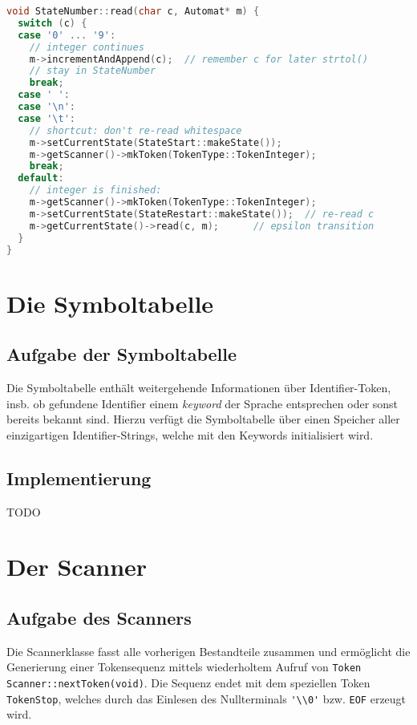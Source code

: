 \documentclass[
a4paper,   %
11pt,      %
oneside,   %
onecolumn, %
final      %
]{article}
\newcommand{\code}[1]{\lstinline$#1$}
\begin{document}
\begin{lstlisting}[language=C++, firstnumber=116, caption={Ausscchnitt aus \texttt{states.cpp}. Die \code{read()}-Methode des Zustands \texttt{Number}.}, label=lst:state]
void StateNumber::read(char c, Automat* m) {
  switch (c) {
  case '0' ... '9':
    // integer continues
    m->incrementAndAppend(c);  // remember c for later strtol()
    // stay in StateNumber
    break;
  case ' ':
  case '\n':
  case '\t':
    // shortcut: don't re-read whitespace
    m->setCurrentState(StateStart::makeState());
    m->getScanner()->mkToken(TokenType::TokenInteger);
    break;
  default:
    // integer is finished:
    m->getScanner()->mkToken(TokenType::TokenInteger);
    m->setCurrentState(StateRestart::makeState());  // re-read c
    m->getCurrentState()->read(c, m);      // epsilon transition
  }
}
\end{lstlisting}



\section{Die Symboltabelle} \label{sec:symtab}

\subsection{Aufgabe der Symboltabelle}
Die Symboltabelle enthält weitergehende Informationen über Identifier-Token, insb. ob gefundene Identifier einem \emph{keyword} der Sprache entsprechen oder sonst bereits bekannt sind.
Hierzu verfügt die Symboltabelle über einen Speicher aller einzigartigen Identifier-Strings, welche mit den Keywords initialisiert wird.


\subsection{Implementierung}
TODO





\section{Der Scanner} \label{sec:scanner}

\subsection{Aufgabe des Scanners}
Die Scannerklasse fasst alle vorherigen Bestandteile zusammen und ermöglicht die Generierung einer Tokensequenz mittels wiederholtem Aufruf von \code{Token Scanner::nextToken(void)}. Die Sequenz endet mit dem speziellen Token \texttt{TokenStop}, welches durch das Einlesen des Nullterminals \code{'\\0'} bzw. \texttt{EOF} erzeugt wird.
\end{document}
